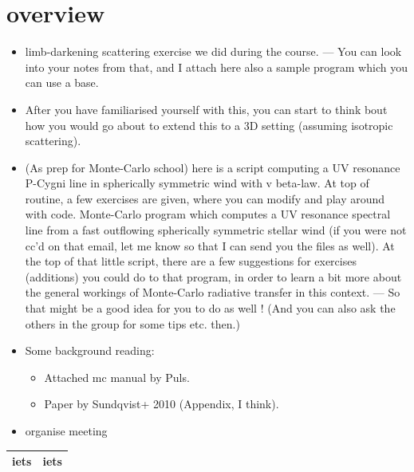 \documentclass[../main/main.tex]{subfiles}
\begin{document}
\section{overview}

\begin{itemize}
\item limb-darkening scattering exercise we did during the course. 
— You can look into your notes from that, and I attach here also a sample program which you can use a base. 

\item After you have familiarised yourself with this, you can start to think bout how you would go about to extend this to a 3D setting (assuming isotropic scattering). 

\item (As prep for Monte-Carlo school) here is a script computing a UV resonance P-Cygni line in spherically symmetric wind with v beta-law. At top of routine, a few exercises are given, where you can modify and play around with code. Monte-Carlo program which computes a UV resonance spectral line from a fast outflowing spherically symmetric stellar wind (if you were not cc’d on that email, let me know so that I can send you the files as well). At the top of that little script, there are a few suggestions for exercises (additions) you could do to that program, in order to learn a bit more about the general workings of Monte-Carlo radiative transfer in this context.  
— So that might be a good idea for you to do as well !   (And you can also ask the others in the group for some tips etc. then.) 

\item Some background reading: 
\begin{itemize}
\item Attached mc manual by Puls. 
\item Paper by Sundqvist+ 2010 (Appendix, I think). 
\end{itemize}

\item organise meeting

\end{itemize}

\begin{center}
\centering
{\tabulinesep=1.5mm
\begin{tabu}{|c|c|}
\hline 
iets & iets \\ \hline
\end{tabu}}
\end{center}
\end{document}
